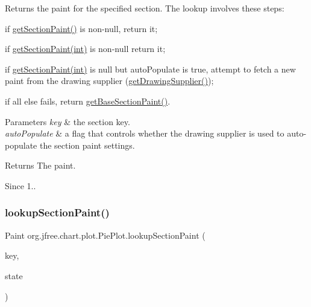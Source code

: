 Returns the paint for the specified section. The lookup involves these steps\+: 
\begin{DoxyItemize}
\item if \mbox{\hyperlink{classorg_1_1jfree_1_1chart_1_1plot_1_1_pie_plot_ad50a2ec9a9fb6fdf8992e8f64f57bd1d}{get\+Section\+Paint()}} is non-\/{\ttfamily null}, return it; 
\item if \mbox{\hyperlink{classorg_1_1jfree_1_1chart_1_1plot_1_1_pie_plot_a3bdefeeb9e51b707b1bec9a4f71775e3}{get\+Section\+Paint(int)}} is non-\/{\ttfamily null} return it; 
\item if \mbox{\hyperlink{classorg_1_1jfree_1_1chart_1_1plot_1_1_pie_plot_a3bdefeeb9e51b707b1bec9a4f71775e3}{get\+Section\+Paint(int)}} is {\ttfamily null} but {\ttfamily auto\+Populate} is {\ttfamily true}, attempt to fetch a new paint from the drawing supplier (\mbox{\hyperlink{classorg_1_1jfree_1_1chart_1_1plot_1_1_plot_a371e21293523674a59d87c9d62ffff15}{get\+Drawing\+Supplier()}}); 
\item if all else fails, return \mbox{\hyperlink{classorg_1_1jfree_1_1chart_1_1plot_1_1_pie_plot_a3f62bcd5bca8122fa099f9607f75d93a}{get\+Base\+Section\+Paint()}}. 
\end{DoxyItemize}


\begin{DoxyParams}{Parameters}
{\em key} & the section key. \\
\hline
{\em auto\+Populate} & a flag that controls whether the drawing supplier is used to auto-\/populate the section paint settings.\\
\hline
\end{DoxyParams}
\begin{DoxyReturn}{Returns}
The paint.
\end{DoxyReturn}
\begin{DoxySince}{Since}
1.. 
\end{DoxySince}
\mbox{\label{classorg_1_1jfree_1_1chart_1_1plot_1_1_pie_plot_afec6ac8c24d4037de8b80f5b5c4c3afc}} 
\subsubsection{\texorpdfstring{lookup\+Section\+Paint()}{lookupSectionPaint()}\hspace{0.1cm}{\footnotesize\ttfamily [3/3]}}
{\footnotesize\ttfamily Paint org.\+jfree.\+chart.\+plot.\+Pie\+Plot.\+lookup\+Section\+Paint (\begin{DoxyParamCaption}\item[{Comparable}]{key,  }\item[{\mbox{\hyperlink{classorg_1_1jfree_1_1chart_1_1plot_1_1_pie_plot_state}{Pie\+Plot\+State}}}]{state }\end{DoxyParamCaption})\hspace{0.3cm}{\ttfamily [protected]}}


